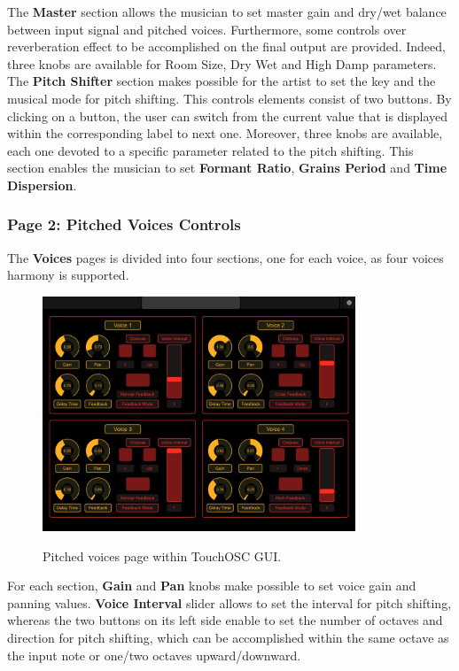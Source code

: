 \documentclass{article}
\begin{document}
The \textbf{Master} section allows the musician to set master gain and dry/wet balance between input signal and pitched voices. Furthermore, some controls over reverberation effect to be accomplished on the final output are provided. Indeed, three knobs are available for Room Size, Dry Wet and High Damp parameters. \\
The \textbf{Pitch Shifter} section makes possible for the artist to set the key and the musical mode for pitch shifting. This controls elements consist of two buttons. By clicking on a button, the user can switch from the current value that is displayed within the corresponding label to next one. Moreover, three knobs are available, each one devoted to a specific parameter related to the pitch shifting. This section enables the musician to set \textbf{Formant Ratio}, \textbf{Grains Period} and \textbf{Time Dispersion}. \\

\subsubsection{Page 2: Pitched Voices Controls}

The \textbf{Voices} pages is divided into four sections, one for each voice, as four voices harmony is supported.

\begin{figure}
{\includegraphics[width=9.35cm]{PitchedVoicesControls-TouchOSC-GUI.png}}\par
    \caption{Pitched voices page within TouchOSC GUI.}
    \label{fig:OSCAddressPatternTouchOSC}
\end{figure}

For each section, \textbf{Gain} and \textbf{Pan} knobs make possible to set voice gain and panning values. \textbf{Voice Interval} slider allows to set the interval for pitch shifting, whereas the two buttons on its left side enable to set the number of octaves and direction for pitch shifting, which can be accomplished within the same octave as the input note or one/two octaves upward/downward. 
\end{document}
